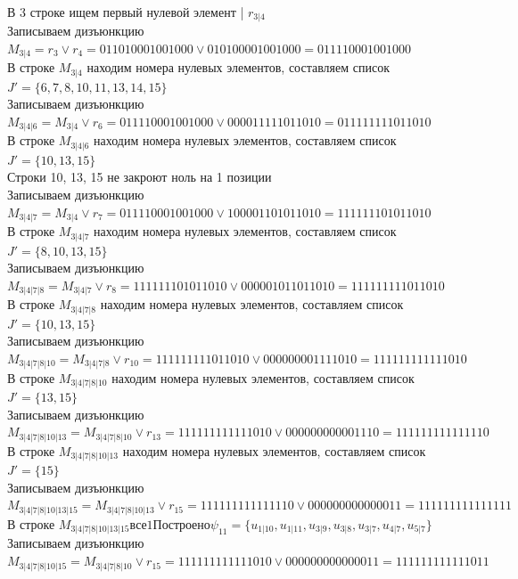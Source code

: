\documentclass[12pt,a4paper]{report}
\begin{document}
 \\
В 3 строке ищем первый нулевой элемент | $r_{3 | 4}$ \\
Записываем дизъюнкцию $M_{3 | 4} = r_{3}\vee r_{4} = 011010001001000 \vee 010100001001000 = 011110001001000$ \\
В строке $M_{3 | 4}$ находим номера нулевых элементов, составляем список $J' = \{6, 7, 8, 10, 11, 13, 14, 15\}$ \\
Записываем дизъюнкцию $M_{3 | 4 | 6} = M_{3 | 4}\vee r_{6} = 011110001001000 \vee 000011111011010 = 011111111011010$ \\
В строке $M_{3 | 4 | 6}$ находим номера нулевых элементов, составляем список $J' = \{10, 13, 15\}$ \\
Строки 10, 13, 15 не закроют ноль на 1 позиции \\
Записываем дизъюнкцию $M_{3 | 4 | 7} = M_{3 | 4}\vee r_{7} = 011110001001000 \vee 100001101011010 = 111111101011010$ \\
В строке $M_{3 | 4 | 7}$ находим номера нулевых элементов, составляем список $J' = \{8, 10, 13, 15\}$ \\
Записываем дизъюнкцию $M_{3 | 4 | 7 | 8} = M_{3 | 4 | 7}\vee r_{8} = 111111101011010 \vee 000001011011010 = 111111111011010$ \\
В строке $M_{3 | 4 | 7 | 8}$ находим номера нулевых элементов, составляем список $J' = \{10, 13, 15\}$ \\
Записываем дизъюнкцию $M_{3 | 4 | 7 | 8 | 10} = M_{3 | 4 | 7 | 8}\vee r_{10} = 111111111011010 \vee 000000001111010 = 111111111111010$ \\
В строке $M_{3 | 4 | 7 | 8 | 10}$ находим номера нулевых элементов, составляем список $J' = \{13, 15\}$ \\
Записываем дизъюнкцию $M_{3 | 4 | 7 | 8 | 10 | 13} = M_{3 | 4 | 7 | 8 | 10}\vee r_{13} = 111111111111010 \vee 000000000001110 = 111111111111110$ \\
В строке $M_{3 | 4 | 7 | 8 | 10 | 13}$ находим номера нулевых элементов, составляем список $J' = \{15\}$ \\
Записываем дизъюнкцию $M_{3 | 4 | 7 | 8 | 10 | 13 | 15} = M_{3 | 4 | 7 | 8 | 10 | 13}\vee r_{15} = 111111111111110 \vee 000000000000011 = 111111111111111$ \\
В строке $M_{3 | 4 | 7 | 8 | 10 | 13 | 15} все 1 Построено \psi_{11} = \{u_{1 | 10},u_{1 | 11},u_{3 | 9},u_{3 | 8},u_{3 | 7},u_{4 | 7},u_{5 | 7}\}$ \\
Записываем дизъюнкцию $M_{3 | 4 | 7 | 8 | 10 | 15} = M_{3 | 4 | 7 | 8 | 10}\vee r_{15} = 111111111111010 \vee 000000000000011 = 111111111111011$ \\
\end{document}
